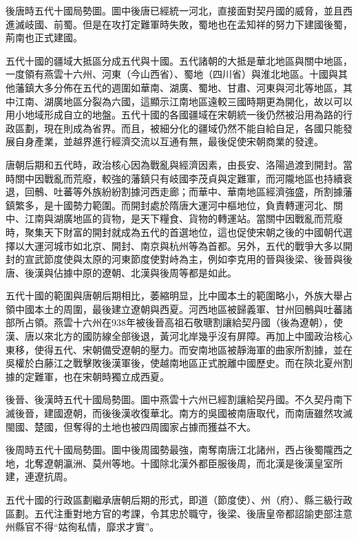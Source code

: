 後唐時五代十國局勢圖。圖中後唐已經統一河北，直接面對契丹國的威脅，並且西進滅岐國、前蜀。但是在攻打定難軍時失敗，蜀地也在孟知祥的努力下建國後蜀，荊南也正式建國。

五代十國的疆域大抵區分成五代與十國。五代諸朝的大抵是華北地區與關中地區，一度領有燕雲十六州、河東（今山西省）、蜀地（四川省）與淮北地區。十國與其他藩鎮大多分佈在五代的週圍如華南、湖廣、蜀地、甘肅、河東與河北等地區，其中江南、湖廣地區分裂為六國，這顯示江南地區遠較三國時期更為開化，故以可以用小地域形成自立的地盤。五代十國的各國疆域在宋朝統一後仍然被沿用為路的行政區劃，現在則成為省界。而且，被細分化的疆域仍然不能自給自足，各國只能發展自身產業，並越界進行經濟交流以互通有無，最後促使宋朝商業的發達。

唐朝后期和五代時，政治核心因為戰亂與經濟因素，由長安、洛陽過渡到開封。當時關中因戰亂而荒廢，較強的藩鎮只有岐國李茂貞與定難軍，而河隴地區也持續衰退，回鶻、吐蕃等外族紛紛割據河西走廊；而華中、華南地區經濟強盛，所割據藩鎮繁多，是十國勢力範圍。而開封處於隋唐大運河中樞地位，負責轉運河北、關中、江南與湖廣地區的貨物，是天下糧食、貨物的轉運站。當關中因戰亂而荒廢時，聚集天下財富的開封就成為五代的首選地位，這也促使宋朝之後的中國朝代選擇以大運河城市如北京、開封、南京與杭州等為首都。另外，五代的戰爭大多以開封的宣武節度使與太原的河東節度使對峙為主，例如李克用的晉與後梁、後晉與後唐、後漢與佔據中原的遼朝、北漢與後周等都是如此。

五代十國的範圍與唐朝后期相比，萎縮明显，比中國本土的範圍略小，外族大舉占領中國本土的周圍，最後建立遼朝與西夏。河西地區被歸義軍、甘州回鶻與吐蕃諸部所占領。燕雲十六州在938年被後晉高祖石敬瑭割讓給契丹國（後為遼朝），使漢、唐以來北方的國防線全部後退，黃河北岸幾乎沒有屏障。再加上中國政治核心東移，使得五代、宋朝備受遼朝的壓力。而安南地區被靜海軍的曲家所割據，並在吳權於白藤江之戰擊敗後漢軍後，使越南地區正式脫離中國歷史。而在陝北夏州割據的定難軍，也在宋朝時獨立成西夏。

後晉、後漢時五代十國局勢圖。圖中燕雲十六州已經割讓給契丹國。不久契丹南下滅後晉，建國遼朝，而後後漢收復華北。南方的吳國被南唐取代，而南唐雖然攻滅閩國、楚國，但奪得的土地也被四周國家占據而獲益不大。

後周時五代十國局勢圖。圖中後周國勢最強，南奪南唐江北諸州，西占後蜀隴西之地，北奪遼朝瀛洲、莫州等地。十國除北漢外都臣服後周，而北漢是後漢皇室所建，連遼抗周。

五代十國的行政區劃繼承唐朝后期的形式，即道（節度使）、州（府）、縣三級行政區劃。五代注重對地方官的考課，令其忠於職守，後梁、後唐皇帝都詔諭吏部注意州縣官不得“姑徇私情，靡求才實”。

